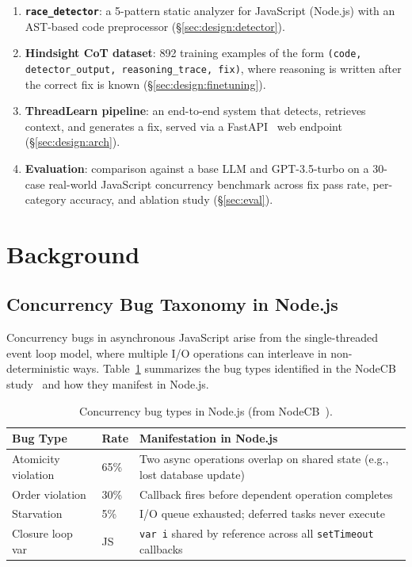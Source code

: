 \documentclass[runningheads]{llncs}
\begin{document}
\begin{enumerate}[leftmargin=2em]
  \item \textbf{\texttt{race\_detector}}: a 5-pattern static analyzer for
    JavaScript (Node.js) with an AST-based code preprocessor
    (\S\ref{sec:design:detector}).
  \item \textbf{Hindsight CoT dataset}: 892 training examples of the form
    \texttt{(code, detector\_output, reasoning\_trace, fix)}, where
    reasoning is written after the correct fix is known
    (\S\ref{sec:design:finetuning}).
  \item \textbf{ThreadLearn pipeline}: an end-to-end system that detects,
    retrieves context, and generates a fix, served via a FastAPI~\cite{fastapi}
    web endpoint (\S\ref{sec:design:arch}).
  \item \textbf{Evaluation}: comparison against a base LLM and GPT-3.5-turbo
    on a 30-case real-world JavaScript concurrency benchmark across fix pass
    rate, per-category accuracy, and ablation study (\S\ref{sec:eval}).
\end{enumerate}

\section{Background}
\label{sec:background}

\subsection{Concurrency Bug Taxonomy in Node.js}
\label{sec:bg:taxonomy}

Concurrency bugs in asynchronous JavaScript arise from the single-threaded
event loop model, where multiple I/O operations can interleave in
non-deterministic ways.
Table~\ref{tab:taxonomy} summarizes the bug types identified in the NodeCB
study~\cite{nodecb2017} and how they manifest in Node.js.

\begin{table}[H]
  \centering
  \caption{Concurrency bug types in Node.js (from NodeCB~\cite{nodecb2017}).}
  \label{tab:taxonomy}
  \begin{tabular}{@{}llp{5.5cm}@{}}
    \toprule
    \textbf{Bug Type} & \textbf{Rate} & \textbf{Manifestation in Node.js} \\
    \midrule
    Atomicity violation & 65\% & Two async operations overlap on shared state (e.g., lost database update) \\
    Order violation     & 30\% & Callback fires before dependent operation completes \\
    Starvation          & 5\%  & I/O queue exhausted; deferred tasks never execute \\
    Closure loop var    & JS   & \texttt{var i} shared by reference across all \texttt{setTimeout} callbacks \\
    \bottomrule
  \end{tabular}
\end{table}
\end{document}
